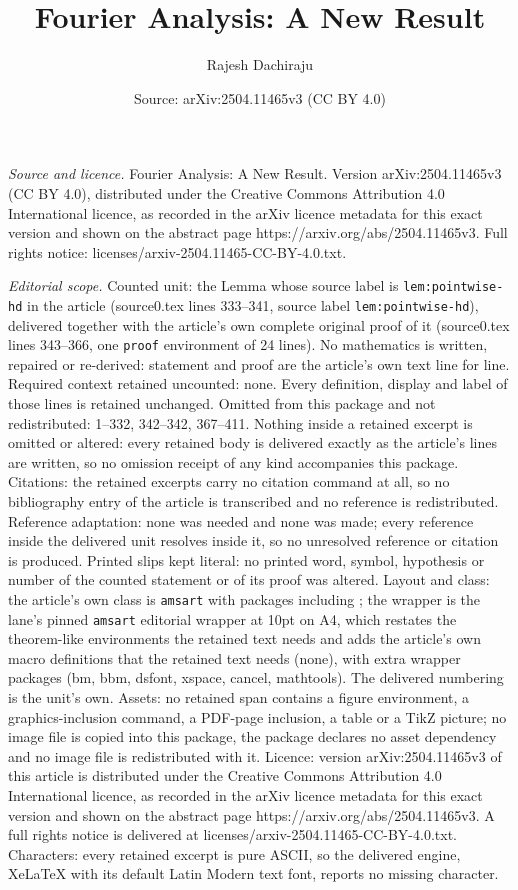 \documentclass[10pt,a4paper]{amsart}
\title[Fourier Analysis: A New Result]{Fourier Analysis: A New Result}
\author{Rajesh Dachiraju}
\date{Source: arXiv:2504.11465v3 (CC BY 4.0)}
\begin{document}
\maketitle

\noindent\emph{Source and licence.} Fourier Analysis: A New Result. Version arXiv:2504.11465v3 (CC BY 4.0), distributed under the Creative Commons Attribution 4.0 International licence, as recorded in the arXiv licence metadata for this exact version and shown on the abstract page https://arxiv.org/abs/2504.11465v3. Full rights notice: licenses/arxiv-2504.11465-CC-BY-4.0.txt.\par\smallskip

\noindent\textit{Editorial scope.} Counted unit: the Lemma whose source label is \texttt{lem:pointwise-hd} in the article (source0.tex lines 333--341, source label \texttt{lem:pointwise-hd}), delivered together with the article's own complete original proof of it (source0.tex lines 343--366, one \texttt{proof} environment of 24 lines). No mathematics is written, repaired or re-derived: statement and proof are the article's own text line for line. Required context retained uncounted: none. Every definition, display and label of those lines is retained unchanged. Omitted from this package and not redistributed: 1--332, 342--342, 367--411. Nothing inside a retained excerpt is omitted or altered: every retained body is delivered exactly as the article's lines are written, so no omission receipt of any kind accompanies this package. Citations: the retained excerpts carry no citation command at all, so no bibliography entry of the article is transcribed and no reference is redistributed. Reference adaptation: none was needed and none was made; every reference inside the delivered unit resolves inside it, so no unresolved reference or citation is produced. Printed slips kept literal: no printed word, symbol, hypothesis or number of the counted statement or of its proof was altered. Layout and class: the article's own class is \texttt{amsart} with packages including ; the wrapper is the lane's pinned \texttt{amsart} editorial wrapper at 10pt on A4, which restates the theorem-like environments the retained text needs and adds the article's own macro definitions that the retained text needs (none), with extra wrapper packages (bm, bbm, dsfont, xspace, cancel, mathtools). The delivered numbering is the unit's own. Assets: no retained span contains a figure environment, a graphics-inclusion command, a PDF-page inclusion, a table or a TikZ picture; no image file is copied into this package, the package declares no asset dependency and no image file is redistributed with it. Licence: version arXiv:2504.11465v3 of this article is distributed under the Creative Commons Attribution 4.0 International licence, as recorded in the arXiv licence metadata for this exact version and shown on the abstract page https://arxiv.org/abs/2504.11465v3. A full rights notice is delivered at licenses/arxiv-2504.11465-CC-BY-4.0.txt. Characters: every retained excerpt is pure ASCII, so the delivered engine, XeLaTeX with its default Latin Modern text font, reports no missing character.
\end{document}

